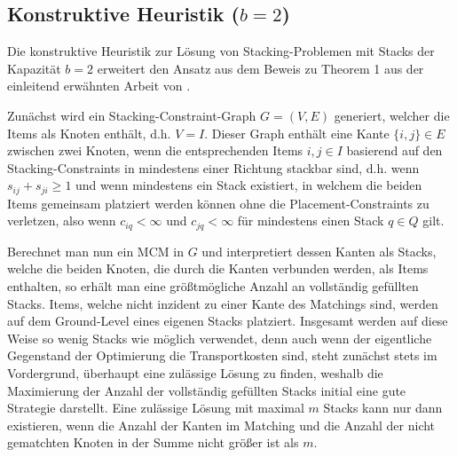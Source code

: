 \subsection{Konstruktive Heuristik ($b = 2$)}
\label{sec:two_cap_heuristic}

Die konstruktive Heuristik zur Lösung von Stacking-Problemen mit Stacks der Kapazität $b=2$ erweitert den Ansatz aus dem Beweis
zu Theorem 1 aus der einleitend erwähnten Arbeit von \citet{Bruns2015}.

Zunächst wird ein Stacking-Constraint-Graph $G = (V, E)$ generiert, welcher die Items als Knoten enthält, d.h. $V = I$. Dieser Graph
enthält eine Kante $\{i, j\} \in E$ zwischen zwei Knoten, wenn die entsprechenden Items $i, j \in I$ basierend auf den Stacking-Constraints
in mindestens einer Richtung stackbar sind, d.h. wenn $s_{ij} + s_{ji} \geq 1$ und wenn mindestens ein Stack existiert, in welchem die beiden Items gemeinsam platziert werden können ohne die Placement-Constraints zu verletzen, also wenn $c_{iq} < \infty$ und $c_{jq} < \infty$ für
mindestens einen Stack $q \in Q$ gilt.

Berechnet man nun ein \textsc{MCM} in $G$ und interpretiert dessen Kanten als Stacks, welche die beiden Knoten, die durch
die Kanten verbunden werden, als Items enthalten, so erhält man eine größtmögliche Anzahl an vollständig gefüllten Stacks.
Items, welche nicht inzident zu einer Kante des Matchings sind, werden auf dem Ground-Level eines eigenen Stacks platziert.
Insgesamt werden auf diese Weise so wenig Stacks wie möglich verwendet, denn auch wenn der eigentliche Gegenstand der Optimierung die Transportkosten sind, steht zunächst stets im Vordergrund, überhaupt eine zulässige Lösung zu finden, weshalb die Maximierung der Anzahl der vollständig gefüllten Stacks initial eine gute Strategie darstellt.
Eine zulässige Lösung mit maximal $m$ Stacks kann nur dann existieren, wenn die Anzahl der Kanten im Matching und die Anzahl der nicht gematchten Knoten in der Summe nicht größer ist als $m$.

